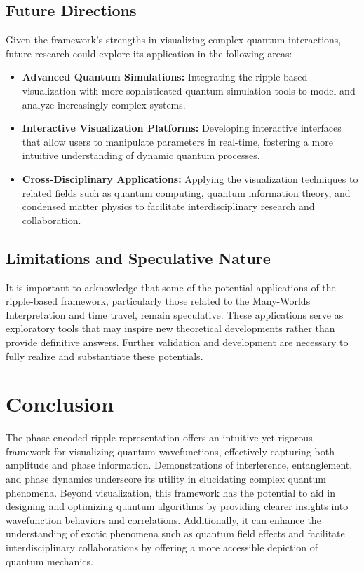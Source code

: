 \documentclass[12pt]{article}
\begin{document}
\subsection{Future Directions}

Given the framework's strengths in visualizing complex quantum interactions, future research could explore its application in the following areas:
\begin{itemize}
    \item \textbf{Advanced Quantum Simulations:} Integrating the ripple-based visualization with more sophisticated quantum simulation tools to model and analyze increasingly complex systems.
    \item \textbf{Interactive Visualization Platforms:} Developing interactive interfaces that allow users to manipulate parameters in real-time, fostering a more intuitive understanding of dynamic quantum processes.
    \item \textbf{Cross-Disciplinary Applications:} Applying the visualization techniques to related fields such as quantum computing, quantum information theory, and condensed matter physics to facilitate interdisciplinary research and collaboration.
\end{itemize}

\subsection{Limitations and Speculative Nature}

It is important to acknowledge that some of the potential applications of the ripple-based framework, particularly those related to the Many-Worlds Interpretation and time travel, remain speculative. These applications serve as exploratory tools that may inspire new theoretical developments rather than provide definitive answers. Further validation and development are necessary to fully realize and substantiate these potentials.

\section{Conclusion}
The phase-encoded ripple representation offers an intuitive yet rigorous framework for visualizing quantum wavefunctions, effectively capturing both amplitude and phase information. Demonstrations of interference, entanglement, and phase dynamics underscore its utility in elucidating complex quantum phenomena. Beyond visualization, this framework has the potential to aid in designing and optimizing quantum algorithms by providing clearer insights into wavefunction behaviors and correlations. Additionally, it can enhance the understanding of exotic phenomena such as quantum field effects and facilitate interdisciplinary collaborations by offering a more accessible depiction of quantum mechanics.
\end{document}

